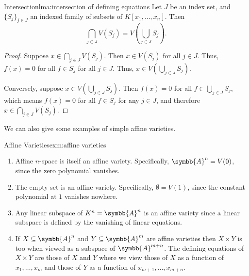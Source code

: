 \documentclass[fleqn]{NotesClass}
\newcommand{\affine}{\symbb{A}}
\begin{document}
    \begin{lma}{Intersection}{lma:intersection of defining equations}
        Let \(J\) be an index set, and \(\{S_j\}_{j \in J}\) an indexed family of subsets of \(K[x_1, \dotsc, x_n]\).
        Then
        \begin{equation}
            \bigcap_{j \in J} V(S_j) = V\left( \bigcup_{j \in J} S_j \right).
        \end{equation}
        \begin{proof}
            Suppose \(x \in \bigcap_{j \in J} V(S_j)\).
            Then \(x \in V(S_j)\) for all \(j \in J\).
            Thus, \(f(x) = 0\) for all \(f \in S_j\) for all \(j \in J\).
            Thus, \(x \in V\left( \bigcup_{j \in J} S_j \right)\).
            
            Conversely, suppose \(x \in V\left( \bigcup_{j \in J} S_j \right)\).
            Then \(f(x) = 0\) for all \(f \in \bigcup_{j \in J} S_j\), which means \(f(x) = 0\) for all \(f \in S_j\) for any \(j \in J\), and therefore \(x \in \bigcap_{j \in J} V(S_j)\).
        \end{proof}
    \end{lma}
    
    We can also give some examples of simple affine varieties.
    
    \begin{exm}{Affine Varieties}{exm:affine varieties}
        \begin{enumerate}
            \item Affine \(n\)-space is itself an affine variety.
            Specifically, \(\affine^n = V(0)\), since the zero polynomial vanishes.
            \item The empty set is an affine variety.
            Specifically, \(\emptyset = V(1)\), since the constant polynomial at \(1\) vanishes nowhere.
            \item Any linear subspace of \(K^n = \affine^n\) is an affine variety since a linear subspace is defined by the vanishing of linear equations.
            \item If \(X \subseteq \affine^n\) and \(Y \subseteq \affine^m\) are affine varieties then \(X \times Y\) is too when viewed as a subspace of \(\affine^{m + n}\).
            The defining equations of \(X \times Y\) are those of \(X\) and \(Y\) where we view those of \(X\) as a function of \(x_1, \dotsc, x_m\) and those of \(Y\) as a function of \(x_{m + 1}, \dotsc, x_{m + n}\).
        \end{enumerate}
    \end{exm}
    
\end{document}
